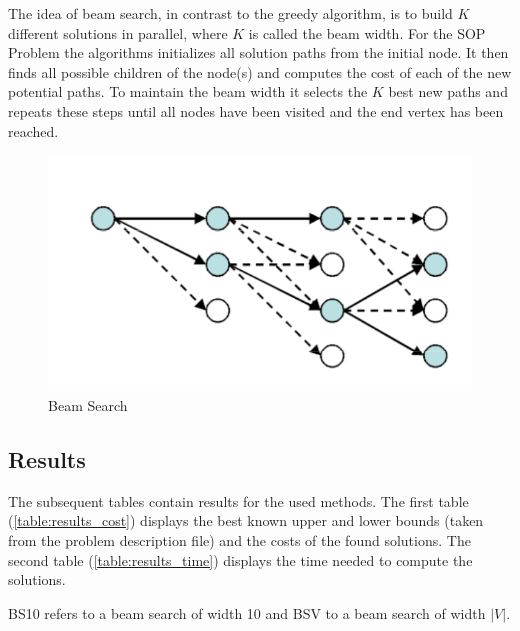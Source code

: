\documentclass[]{article}
\begin{document}
    The idea of beam search, in contrast to the greedy algorithm, is to build $K$ different solutions in parallel, where $K$ is called the beam width. For the SOP Problem the algorithms initializes all solution paths from the initial node. It then finds all possible children of the node(s) and computes the cost of each of the new potential paths. To maintain the beam width it selects the $K$ best new paths and repeats these steps until all nodes have been visited and the end vertex has been reached. \cite{Beam:1} \cite{Beam:2} 

    \begin{figure}[H]
    	\includegraphics[]{files/beam_search.png}
    	\centering
    	\caption{Beam Search}
    \end{figure}

    \subsection{Results}
    \label{results}

    The subsequent tables contain results for the used methods. The first table (\ref{table:results_cost}) displays the best known upper and lower bounds (taken from the problem description file) and the costs of the found solutions. The second table (\ref{table:results_time}) displays the time needed to compute the solutions.
    
    BS10 refers to a beam search of width 10 and BSV to a beam search of width $|V|$.
\end{document}
